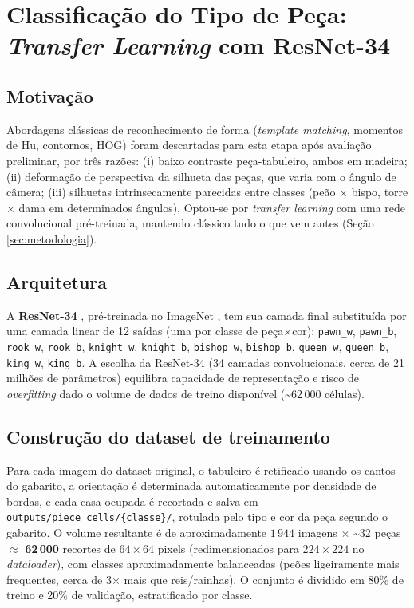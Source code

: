 \section{Classificação do Tipo de Peça: \textit{Transfer Learning} com ResNet-34}
\label{sec:deep-learning}

\subsection{Motivação}

Abordagens clássicas de reconhecimento de forma (\textit{template matching},
momentos de Hu, contornos, HOG) foram descartadas para esta etapa após avaliação
preliminar, por três razões: (i) baixo contraste peça-tabuleiro, ambos em madeira; (ii)
deformação de perspectiva da silhueta das peças, que varia com o ângulo de câmera; (iii)
silhuetas intrinsecamente parecidas entre classes (peão $\times$ bispo, torre $\times$
dama em determinados ângulos). Optou-se por \textit{transfer learning} com uma rede
convolucional pré-treinada, mantendo clássico tudo o que vem antes (Seção
\ref{sec:metodologia}).

\subsection{Arquitetura}

A \textbf{ResNet-34} \cite{resnet}, pré-treinada no ImageNet \cite{imagenet}, tem sua
camada final substituída por uma camada linear de 12 saídas (uma por classe de
peça$\times$cor): \texttt{pawn\_w}, \texttt{pawn\_b}, \texttt{rook\_w},
\texttt{rook\_b}, \texttt{knight\_w}, \texttt{knight\_b}, \texttt{bishop\_w},
\texttt{bishop\_b}, \texttt{queen\_w}, \texttt{queen\_b}, \texttt{king\_w},
\texttt{king\_b}. A escolha da ResNet-34 (34 camadas convolucionais, cerca de 21
milhões de parâmetros) equilibra capacidade de representação e risco de
\textit{overfitting} dado o volume de dados de treino disponível (\textasciitilde62\,000
células).

\subsection{Construção do dataset de treinamento}

Para cada imagem do dataset original, o tabuleiro é retificado usando os cantos do
gabarito, a orientação é determinada automaticamente por densidade de bordas, e cada
casa ocupada é recortada e salva em \texttt{outputs/piece\_cells/\{classe\}/}, rotulada
pelo tipo e cor da peça segundo o gabarito. O volume resultante é de
aproximadamente $1\,944$ imagens $\times$ \textasciitilde32 peças $\approx$
\textbf{62\,000} recortes de $64\times64$ pixels (redimensionados para $224\times224$ no
\textit{dataloader}), com classes aproximadamente balanceadas (peões ligeiramente mais
frequentes, cerca de 3$\times$ mais que reis/rainhas). O conjunto é dividido em 80\% de
treino e 20\% de validação, estratificado por classe.

